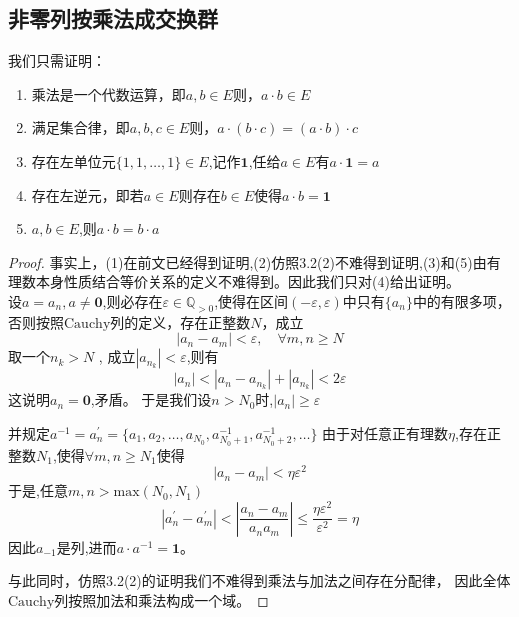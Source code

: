 \documentclass[12pt, a4paper, oneside]{ctexart}
\newcommand{\ep}{\varepsilon}
\newcommand{\mul}{\cdot}
\newcommand{\cau}{\text{Cauchy}}
\newcommand{\an}{\{a_{n}\}}
\begin{document}
\subsection{非零列按乘法成交换群}
我们只需证明：
\begin{enumerate}[(1)]
    \item 乘法是一个代数运算，即$a,b\in E$则，$a \mul b\in E$
    \item 满足集合律，即$a,b,c\in E$则，$a\mul(b\mul c)=(a\mul b)\mul c$
    \item 存在左单位元$\{ 1,1,\dots,1\}\in E$,记作$\textbf{1}$,任给$a\in E$有$a\mul \textbf{1} =a$
    \item 存在左逆元，即若$a\in E$则存在$b\in E$使得$a\mul b=\textbf{1}$
    \item $a,b\in E$,则$a\mul b=b\mul a$
\end{enumerate}
\begin{proof}
    事实上，(1)在前文已经得到证明,(2)仿照3.2(2)不难得到证明,(3)和(5)由有理数本身性质结合等价关系的定义不难得到。因此我们只对(4)给出证明。\\
    设$a={a_{n}},a\neq\textbf{0}$,则必存在$\ep\in \mathbb{Q}_{>0}$,使得在区间$(-\ep,\ep)$中只有$\an$中的有限多项，否则按照$\cau$列的定义，存在正整数$N$，成立
    \begin{equation*}
        |a_{n}-a_{m}|<\ep,\quad \forall m,n\ge N
    \end{equation*}
    取一个$n_{k}>N$ , 成立$|a_{n_{k}}| < \ep $,则有
    \begin{equation*}
        |a_{n}|<|a_{n}-a_{n_{k}}|+|a_{n_{k}}|<2\ep
    \end{equation*}
    这说明$a_{n}=\textbf{0}$,矛盾。
    于是我们设$n>N_{0}$时,$|a_{n}|\ge \ep$

    并规定$a^{-1}=a_{n}^{\prime}=\{a_{1},a_{2},\dots,a_{N_{0}},a_{N_{0}+1}^{-1},a_{N_{0}+2}^{-1},\dots\}$
    由于对任意正有理数$\eta$,存在正整数$N_{1}$,使得$\forall m,n\ge N_{1}$使得
    \begin{equation}
        |a_{n}-a_{m}|<\eta \ep^{2}
    \end{equation}
    于是,任意$m,n>\text{max}(N_{0},N_{1})$
    \begin{equation*}
        |a_{n}^{\prime}-a_{m}^{\prime}|< \left| \frac{a_{n}-a_{m}}{a_{n}a_{m}}\right|
        \le \frac{\eta \ep^{2}}{\ep^{2}}=\eta
    \end{equation*}
    因此$a_{-1}$是\cau 列,进而$a\mul a^{-1}=\textbf{1}$。

    与此同时，仿照3.2(2)的证明我们不难得到乘法与加法之间存在分配律，
    因此全体$\cau$列按照加法和乘法构成一个域。

\end{proof}
\end{document}
